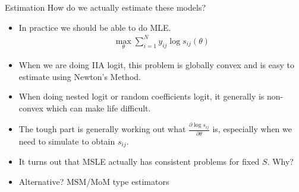 \begin{frame}{Estimation}
How do we actually estimate these models?
\begin{itemize}
\item In practice we should be able to do MLE.
\begin{eqnarray*}
\max_{\theta} \sum_{i=1}^N y_{ij} \log s_{ij}(\theta)
\end{eqnarray*}
\item When we are doing IIA logit, this problem is globally convex and is easy to estimate using Newton's Method.
\item When doing nested logit or random coefficients logit, it generally is non-convex which can make life difficult.
\item The tough part is generally working out what $\frac{\partial \log s_{ij}}{\partial \theta}$ is, especially when we need to simulate to obtain $s_{ij}$.
\item It turns out that MSLE actually has consistent problems for fixed $S$. Why?
\item Alternative? MSM/MoM type estimators
\end{itemize}
\end{frame}






